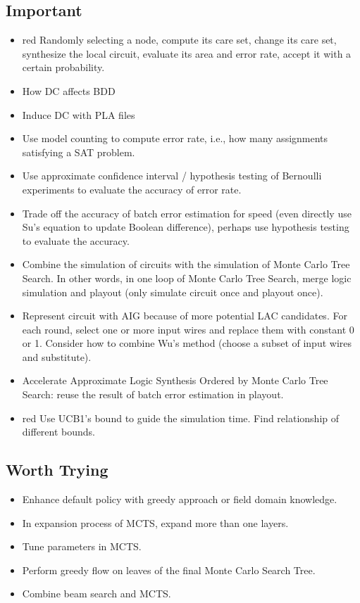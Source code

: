 \documentclass{rpt}
\begin{document}
\subsection{Important}
\begin{itemize}
    \item
        \begin{color}{red}
        Randomly selecting a node,
        compute its care set,
        change its care set,
        synthesize the local circuit,
        evaluate its area and error rate,
        accept it with a certain probability.
        \end{color}
    \item How DC affects BDD
    \item Induce DC with PLA files
    \item Use model counting to compute error rate, i.e., how many assignments satisfying a SAT problem.
    \item Use approximate confidence interval / hypothesis testing of Bernoulli experiments to evaluate the accuracy of error rate.
    \item Trade off the accuracy of batch error estimation for speed
        (even directly use Su's equation to update Boolean difference),
        perhaps use hypothesis testing to evaluate the accuracy.
    \item Combine the simulation of circuits with the simulation of Monte Carlo Tree Search.
        In other words,
        in one loop of Monte Carlo Tree Search,
        merge logic simulation and playout (only simulate circuit once and playout once).
    \item Represent circuit with AIG because of more potential LAC candidates.
        For each round, select one or more input wires and replace them with constant 0 or 1.
        Consider how to combine Wu's method (choose a subset of input wires and substitute).
    \item Accelerate Approximate Logic Synthesis Ordered by Monte Carlo Tree Search:
        reuse the result of batch error estimation in playout.
    \item
        \begin{color}{red}
            Use UCB1's bound to guide the simulation time.
            Find relationship of different bounds.
        \end{color}
\end{itemize}

\subsection{Worth Trying}
\begin{itemize}
    \item Enhance default policy with greedy approach or field domain knowledge.
    \item In expansion process of MCTS, expand more than one layers.
    \item Tune parameters in MCTS\@.
    \item Perform greedy flow on leaves of the final Monte Carlo Search Tree.
    \item Combine beam search and MCTS\@.
\end{itemize}
\end{document}
